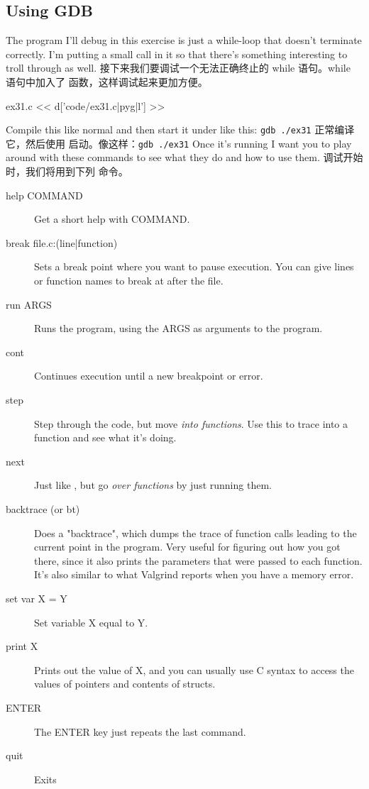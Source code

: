 \begin{enumerate}
\section{Using GDB}

The program I'll debug in this exercise is just a while-loop that doesn't
terminate correctly.  I'm putting a small  call in it so that
there's something interesting to troll through as well.
接下来我们要调试一个无法正确终止的 while 语句。while 语句中加入了
 函数，这样调试起来更加方便。

\begin{code}{ex31.c}
<< d['code/ex31.c|pyg|l'] >>
\end{code}

Compile this like normal and then start it under  like this:  \verb|gdb ./ex31|
正常编译它，然后使用  启动。像这样：\verb|gdb ./ex31|
Once it's running I want you to play around with these  commands
to see what they do and how to use them.
调试开始时，我们将用到下列  命令。

\begin{description}
\item[help COMMAND] Get a short help with COMMAND.
\item[break file.c:(line|function)] Sets a break point where you want to pause execution.  You can give lines or function names to break at after the file.
\item[run ARGS] Runs the program, using the ARGS as arguments to the program.
\item[cont] Continues execution until a new breakpoint or error.
\item[step] Step through the code, but move \emph{into functions}.  Use this to 
    trace into a function and see what it's doing.
\item[next] Just like , but go \emph{over functions} by just running them.
\item[backtrace (or bt)] Does a "backtrace", which dumps the trace of function
    calls leading to the current point in the program. Very useful for figuring
    out how you got there, since it also prints the parameters that were passed
    to each function.  It's also similar to what Valgrind reports when you have
    a memory error.
\item[set var X = Y] Set variable X equal to Y.
\item[print X] Prints out the value of X, and you can usually use C syntax to access
    the values of pointers and contents of structs.
\item[ENTER] The ENTER key just repeats the last command.
\item[quit] Exits 
\end{description}


\end{enumerate}
